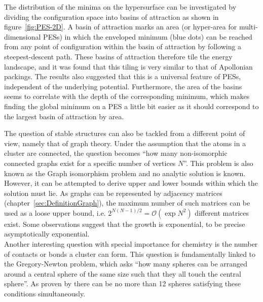 %
The distribution of the minima on the hypersurface can be investigated by
dividing the configuration space into basins of attraction as shown in
figure~\ref{fig:PES-2D}. A basin of attraction marks an area (or hyper-area for
multi-dimensional \acp{PES}) in which the enveloped minimum (blue dots) can be
reached from any point of configuration within the basin of attraction by
following a steepest-descent path. These basins of attraction therefore tile the
energy landscape, and it was found that this tiling is very similar to that of
Apollonian packings.\autocite{Massen_Powerlawdistributionsareas_2007} The
results also suggested that this is a universal feature of \acp{PES},
independent of the underlying potential. Furthermore, the area of the basins
seems to correlate with the depth of the corresponding minimum, which makes
finding the global minimum on a \ac{PES} a little bit easier as it should
correspond to the largest basin of attraction by area.

The question of stable structures can also be tackled from a different point of
view, namely that of graph theory. Under the assumption that the atoms in a
cluster are connected, the question becomes ``how many non-isomorphic connected
graphs exist for a specific number of vertices $N$''. This problem is also known
as the Graph isomorphism problem and no analytic solution is known. However, it
can be attempted to derive upper and lower bounds within which the solution must
lie. As graphs can be represented by adjacency matrices
(chapter~\ref{sec:DefinitionGraph}), the maximum number of such matrices can be
used as a loose upper bound, i.e.
$2^{N(N-1)/2}=\mathcal{O}\left(\exp{N^2}\right)$ different matrices
exist.\autocite{Arkus_Minimalenergyclusters_2009} Some observations
suggest\autocite{Tsai_Useeigenmodemethod_1993} that the growth is exponential,
to be precise asymptotically
exponential.\autocite{Stillinger_Packingstructurestransitions_1984,Stillinger_Exponentialmultiplicityinherent_1999}
\\\newline
Another interesting question with special importance for chemistry is the number
of contacts or bonds a cluster can form. This question is fundamentally linked
to the Gregory-Newton problem, which asks ``how many spheres can be arranged
around a central sphere of the same size such that they all touch the central
sphere''. As proven by
\citeauthor{Schutte_ProblemdreizehnKugeln_1952}\autocite{Schutte_ProblemdreizehnKugeln_1952}
there can be no more than 12 spheres satisfying these conditions simultaneously.

